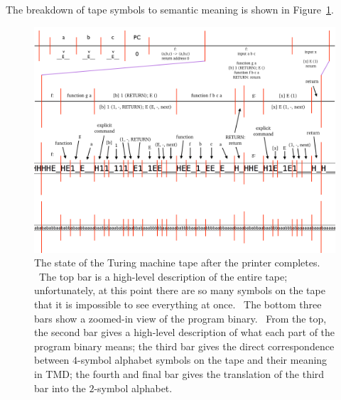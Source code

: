 \documentclass[11pt]{article}
\begin{document}
The breakdown of tape symbols to semantic meaning is shown in Figure~\ref{fig:postprog}.

\begin{figure}
\begin{center}
\includegraphics[scale=0.42]{figs/postprog.png}
\caption{The state of the Turing machine tape after the printer completes. \ The top bar is a high-level description of the entire tape; unfortunately, at this point there are so many symbols on the tape that it is impossible to see everything at once. \ The bottom three bars show a zoomed-in view of the program binary. \ From the top, the second bar gives a high-level description of what each part of the program binary means; the third bar gives the direct correspondence between $4$-symbol alphabet symbols on the tape and their meaning in TMD; the fourth and final bar gives the translation of the third bar into the $2$-symbol alphabet. \label{fig:postprog}}
\end{center}
\end{figure}
\end{document}

